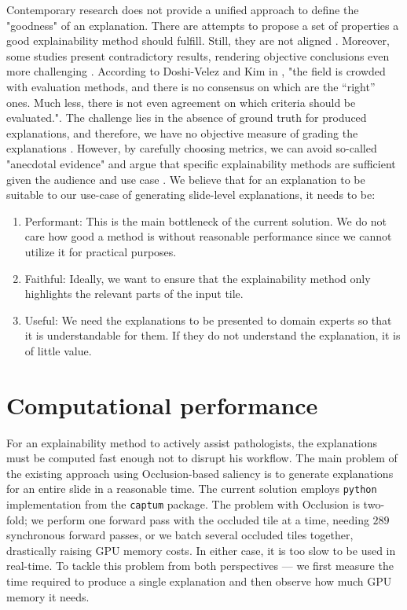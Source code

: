 Contemporary research does not provide a unified approach to define the "goodness" of an explanation.
There are attempts to propose a set of properties a good explainability method should fulfill. Still, they are not aligned \cite{xai-functionality-grounded, explainability-hard, xai-meta-survey, xai-zhou-survey}.
Moreover, some studies present contradictory results, rendering objective conclusions even more challenging \cite{xai-zhou-survey}.
According to Doshi-Velez and Kim in \cite{xai-doshi}, "the field is crowded with evaluation methods, and there is no consensus on which are the “right” ones. 
Much less, there is not even agreement on which criteria should be evaluated.".
The challenge lies in the absence of ground truth for produced explanations, and therefore, we have no objective measure of grading the explanations \cite{xai-zhou-survey}.
However, by carefully choosing metrics, we can avoid so-called "anecdotal evidence" and argue that specific explainability methods are sufficient given the audience and use case \cite{xai-anecdotal-evidence}.
We believe that for an explanation to be suitable to our use-case of generating slide-level explanations, it needs to be:
\begin{enumerate}
    \item Performant: This is the main bottleneck of the current solution. We do not care how good a method is without reasonable performance since we cannot utilize it for practical purposes.
    \item Faithful: Ideally, we want to ensure that the explainability method only highlights the relevant parts of the input tile.
    \item Useful: We need the explanations to be presented to domain experts so that it is understandable for them. If they do not understand the explanation, it is of little value. 
\end{enumerate}

\section{Computational performance}

For an explainability method to actively assist pathologists, the explanations must be computed fast enough not to disrupt his workflow.
The main problem of the existing approach using Occlusion-based saliency is to generate explanations for an entire slide in a reasonable time.
The current solution employs \texttt{python} implementation from the \texttt{captum} package.
The problem with Occlusion is two-fold; we perform one forward pass with the occluded tile at a time, needing $289$ synchronous forward passes, or we batch several occluded tiles together, drastically raising GPU memory costs.
In either case, it is too slow to be used in real-time.
To tackle this problem from both perspectives --- we first measure the time required to produce a single explanation and then observe how much GPU memory it needs.

